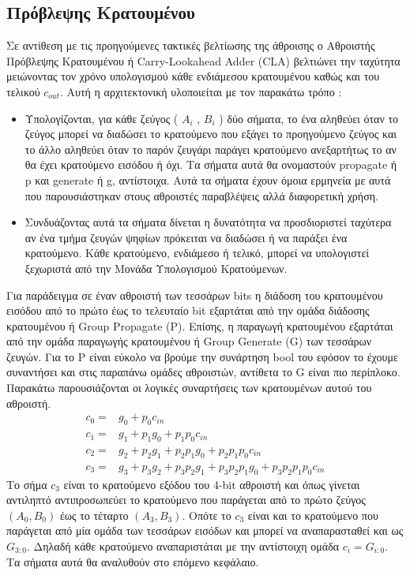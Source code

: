 \subsection{Πρόβλεψης Κρατουμένου}
Σε αντίθεση με τις προηγούμενες τακτικές βελτίωσης της άθροισης ο Αθροιστής Πρόβλεψης Κρατουμένου ή Carry-Lookahead Adder (CLA) βελτιώνει την ταχύτητα μειώνοντας τον χρόνο υπολογισμού κάθε ενδιάμεσου κρατουμένου καθώς και του τελικού $c_{out}$.
Αυτή η αρχιτεκτονική υλοποιείται με τον παρακάτω τρόπο :
\begin{itemize}
    \item Υπολογίζονται, για κάθε ζεύγος ( $A_i$ , $B_i$ ) δύο σήματα, το ένα αληθεύει 
    όταν το ζεύγος μπορεί να διαδώσει το κρατούμενο που εξάγει το προηγούμενο ζεύγος 
    και το άλλο αληθεύει όταν το παρόν ζευγάρι παράγει κρατούμενο ανεξαρτήτως το 
    αν θα έχει κρατούμενο εισόδου ή όχι. Τα σήματα αυτά θα ονομαστούν propagate ή p
    και generate ή g, αντίστοιχα. Αυτά τα σήματα έχουν όμοια ερμηνεία με αυτά που παρουσιάστηκαν στους αθροιστές παραβλέψεις αλλά διαφορετική χρήση.
    \item Συνδυάζοντας αυτά τα σήματα δίνεται η δυνατότητα να προσδιοριστεί ταχύτερα αν ένα τμήμα ζευγών ψηφίων πρόκειται να διαδώσει ή να παράξει ένα κρατούμενο. Κάθε κρατούμενο, ενδιάμεσο ή τελικό, μπορεί να υπολογιστεί ξεχωριστά από την Μονάδα Υπολογισμού Κρατούμενων.
\end{itemize}


Για παράδειγμα σε έναν αθροιστή των τεσσάρων bits η διάδοση του κρατουμένου εισόδου από το πρώτο έως το τελευταίο bit εξαρτάται από την ομάδα διάδοσης κρατουμένου ή Group Propagate (P). Επίσης, η παραγωγή κρατουμένου εξαρτάται από την ομάδα παραγωγής κρατουμένου ή Group Generate (G) των τεσσάρων ζευγών. Για το P είναι εύκολο να βρούμε την συνάρτηση bool του εφόσον το έχουμε συναντήσει και στις παραπάνω ομάδες αθροιστών, αντίθετα το G είναι πιο περίπλοκο. Παρακάτω παρουσιάζονται οι λογικές συναρτήσεις των κρατουμένων αυτού του αθροιστή.
\begin{equation}
    \begin{split}
        c_0 =& g_0 + p_0c_{in}\\
        c_1 =& g_1 + p_1g_0 + p_1p_0c_{in}\\
        c_2 =& g_2 + p_2g_1 + p_2p_1g_0 + p_2p_1p_0c_{in}\\
        c_3 =& g_3 + p_3g_2 + p_3p_2g_1 + p_3p_2p_1g_0 + p_3p_2p_1p_0c_{in}
    \end{split}
    \label{eq:cla_carries_4bit}
\end{equation}
Το σήμα $c_3$ είναι το κρατούμενο εξόδου του 4-bit αθροιστή και όπως γίνεται αντιληπτό αντιπροσωπεύει το κρατούμενο που παράγεται από το πρώτο ζεύγος $(Α_0,Β_0)$ έως το τέταρτο $(A_3,B_3)$. Οπότε το $c_3$ είναι και το κρατούμενο που παράγεται από μία ομάδα των τεσσάρων εισόδων και μπορεί να αναπαρασταθεί και ως $G_{3:0}$. Δηλαδή κάθε κρατούμενο αναπαριστάται με την αντίστοιχη ομάδα $c_i = G_{i:0}$. Τα σήματα αυτά θα αναλυθούν στο επόμενο κεφάλαιο.

